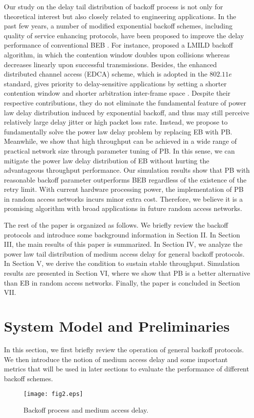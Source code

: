 \documentclass[journal]{IEEEtran}
\begin{document}
Our study on the delay tail distribution of backoff process is not only for theoretical interest but also closely related to engineering applications. In the past few years, a number of modified exponential backoff schemes, including quality of service enhancing protocols, have been proposed to improve the delay performance of conventional BEB \cite{2004:Deng,2008:Barcelo,2003:Mangold}. For instance, \cite{2004:Deng} proposed a LMILD backoff algorithm, in which the contention window doubles upon collisions whereas decreases linearly upon successful transmissions. Besides, the enhanced distributed channel access (EDCA) scheme, which is adopted in the $802.11e$ standard, gives priority to delay-sensitive applications by setting a shorter contention window and shorter arbitration inter-frame space \cite{2003:Mangold}. Despite their respective contributions, they do not eliminate the fundamental feature of power law delay distribution induced by exponential backoff, and thus may still perceive relatively large delay jitter or high packet loss rate. Instead, we propose to fundamentally solve the power law delay problem by replacing EB with PB. Meanwhile, we show that high throughput can be achieved in a wide range of practical network size through parameter tuning of PB. In this sense, we can mitigate the power law delay distribution of EB without hurting the advantageous throughput performance. Our simulation results show that PB with reasonable backoff parameter outperforms BEB regardless of the existence of the retry limit. With current hardware processing power, the implementation of PB in random access networks incurs minor extra cost. Therefore, we believe it is a promising algorithm with broad applications in future random access networks.

The rest of the paper is organized as follows. We briefly review the backoff protocols and introduce some background information in Section II. In Section III, the main results of this paper is summarized. In Section IV, we analyze the power law tail distribution of medium access delay for general backoff protocols. In Section V, we derive the condition to sustain stable throughput. Simulation results are presented in Section VI, where we show that PB is a better alternative than EB in random access networks. Finally, the paper is concluded in Section VII.

\section{System Model and Preliminaries}
In this section, we first briefly review the operation of general backoff protocols. We then introduce the notion of medium access delay and some important metrics that will be used in later sections to evaluate the performance of different backoff schemes.
\begin{figure}
\centering
  \begin{center}
    \texttt{[image: fig2.eps]}
  \end{center}
  \caption{Backoff process and medium access delay.}
  \label{52}
\end{figure}
\end{document}
